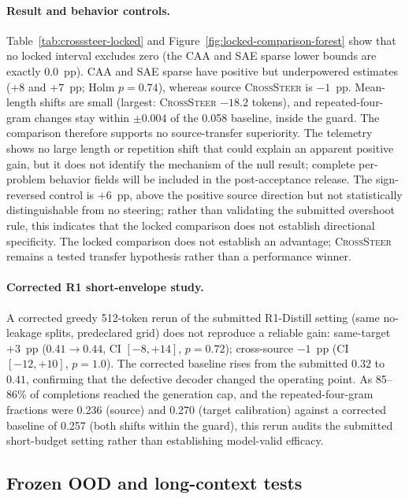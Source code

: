 \paragraph{Result and behavior controls.}
Table~\ref{tab:crosssteer-locked} and Figure~\ref{fig:locked-comparison-forest}
show that no locked interval excludes zero (the CAA and SAE sparse lower
bounds are exactly 0.0~pp).  CAA and SAE sparse have positive but
underpowered estimates ($+8$ and $+7$~pp; Holm $p=0.74$), whereas source
\textsc{CrossSteer} is $-1$~pp.  Mean-length shifts are small (largest:
\textsc{CrossSteer} $-18.2$ tokens), and repeated-four-gram changes stay within
$\pm0.004$ of the 0.058 baseline, inside the guard.  The comparison therefore supports no source-transfer superiority.  The telemetry
shows no large length or repetition shift that could explain an apparent positive
gain, but it does not identify the mechanism of the null result; complete
per-problem behavior fields will be included in the post-acceptance release.  The sign-reversed control is $+6$~pp, above the positive source direction
but not statistically distinguishable from no steering; rather than
validating the submitted overshoot rule, this indicates that the locked
comparison does not establish directional specificity.  The locked comparison does not establish an advantage; \textsc{CrossSteer}
remains a tested transfer hypothesis rather than a performance winner.

\paragraph{Corrected R1 short-envelope study.}
A corrected greedy 512-token rerun of the submitted R1-Distill setting (same
no-leakage splits, predeclared grid) does not reproduce a reliable gain:
same-target $+3$~pp ($0.41{\to}0.44$, CI $[-8,+14]$, $p{=}0.72$);
cross-source $-1$~pp (CI $[-12,+10]$, $p{=}1.0$).  The corrected baseline
rises from the submitted $0.32$ to $0.41$, confirming that the defective
decoder changed the operating point.  As 85--86\% of completions reached
the generation cap, and the repeated-four-gram fractions were 0.236 (source)
and 0.270 (target calibration) against a corrected baseline of 0.257 (both
shifts within the guard), this rerun audits the
submitted short-budget setting rather than establishing model-valid efficacy.

\subsection{Frozen OOD and long-context tests}

